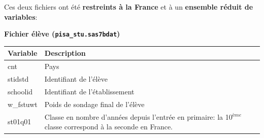 \documentclass[12pt,twosided, notitlepage]{book}
\begin{document}
Ces deux fichiers ont été \textbf{restreints à la France} et à un
\textbf{ensemble réduit de variables}:

\textbf{Fichier élève (\texttt{pisa\_stu.sas7bdat})}

\begin{longtable}[]{@{}ll@{}}
\toprule
\begin{minipage}[b]{0.38\columnwidth}\raggedright\strut
\textbf{Variable}\strut
\end{minipage} & \begin{minipage}[b]{0.55\columnwidth}\raggedright\strut
\textbf{Description}\strut
\end{minipage}\tabularnewline
\midrule
\endhead
\begin{minipage}[t]{0.38\columnwidth}\raggedright\strut
cnt\strut
\end{minipage} & \begin{minipage}[t]{0.55\columnwidth}\raggedright\strut
Pays\strut
\end{minipage}\tabularnewline
\begin{minipage}[t]{0.38\columnwidth}\raggedright\strut
stidstd\strut
\end{minipage} & \begin{minipage}[t]{0.55\columnwidth}\raggedright\strut
Identifiant de l'élève\strut
\end{minipage}\tabularnewline
\begin{minipage}[t]{0.38\columnwidth}\raggedright\strut
schoolid\strut
\end{minipage} & \begin{minipage}[t]{0.55\columnwidth}\raggedright\strut
Identifiant de l'établissement\strut
\end{minipage}\tabularnewline
\begin{minipage}[t]{0.38\columnwidth}\raggedright\strut
w\_fstuwt\strut
\end{minipage} & \begin{minipage}[t]{0.55\columnwidth}\raggedright\strut
Poids de sondage final de l'élève\strut
\end{minipage}\tabularnewline
\begin{minipage}[t]{0.38\columnwidth}\raggedright\strut
st01q01\strut
\end{minipage} & \begin{minipage}[t]{0.55\columnwidth}\raggedright\strut
Classe en nombre d'années depuis l'entrée en primaire: la 10\(^{ème}\)
classe correspond à la seconde en France.\strut
\end{minipage}\tabularnewline

\end{longtable}
\end{document}
